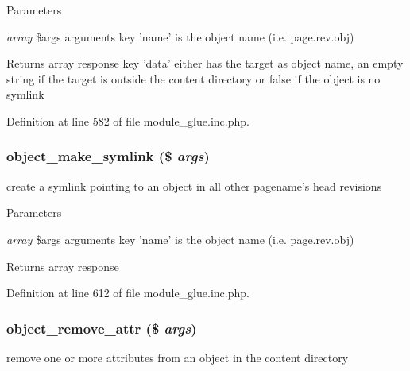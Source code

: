 \begin{DoxyParams}{Parameters}
\item[{\em array}]\$args arguments key 'name' is the object name (i.e. page.rev.obj) \end{DoxyParams}
\begin{DoxyReturn}{Returns}
array response key 'data' either has the target as object name, an empty string if the target is outside the content directory or false if the object is no symlink 
\end{DoxyReturn}


Definition at line 582 of file module\_\-glue.inc.php.

\hypertarget{module__glue_8inc_8php_a14e6da411df5aa9ff38e2d4ea27dd077}{
\subsubsection[{object\_\-make\_\-symlink}]{\setlength{\rightskip}{0pt plus 5cm}object\_\-make\_\-symlink (\$ {\em args})}}
\label{module__glue_8inc_8php_a14e6da411df5aa9ff38e2d4ea27dd077}
create a symlink pointing to an object in all other pagename's head revisions


\begin{DoxyParams}{Parameters}
\item[{\em array}]\$args arguments key 'name' is the object name (i.e. page.rev.obj) \end{DoxyParams}
\begin{DoxyReturn}{Returns}
array response 
\end{DoxyReturn}


Definition at line 612 of file module\_\-glue.inc.php.

\hypertarget{module__glue_8inc_8php_ae16d748c2d933978daec8bf11acdc34b}{
\subsubsection[{object\_\-remove\_\-attr}]{\setlength{\rightskip}{0pt plus 5cm}object\_\-remove\_\-attr (\$ {\em args})}}
\label{module__glue_8inc_8php_ae16d748c2d933978daec8bf11acdc34b}
remove one or more attributes from an object in the content directory


